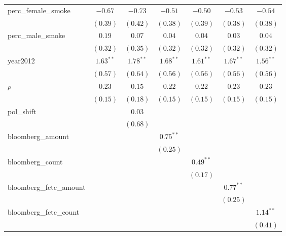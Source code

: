 \begin{table}[!h]
\begin{center}
\begin{tabular}{l c c c c c c }
perc\_female\_smoke     & $-0.67$     & $-0.73$     & $-0.51$     & $-0.50$     & $-0.53$     & $-0.54$     \\
                        & $(0.39)$    & $(0.42)$    & $(0.38)$    & $(0.39)$    & $(0.38)$    & $(0.38)$    \\
perc\_male\_smoke       & $0.19$      & $0.07$      & $0.04$      & $0.04$      & $0.03$      & $0.04$      \\
                        & $(0.32)$    & $(0.35)$    & $(0.32)$    & $(0.32)$    & $(0.32)$    & $(0.32)$    \\
year2012                & $1.63^{**}$ & $1.78^{**}$ & $1.68^{**}$ & $1.61^{**}$ & $1.67^{**}$ & $1.56^{**}$ \\
                        & $(0.57)$    & $(0.64)$    & $(0.56)$    & $(0.56)$    & $(0.56)$    & $(0.56)$    \\
$\rho$                  & $0.23$      & $0.15$      & $0.22$      & $0.22$      & $0.23$      & $0.23$      \\
                        & $(0.15)$    & $(0.18)$    & $(0.15)$    & $(0.15)$    & $(0.15)$    & $(0.15)$    \\
pol\_shift              &             & $0.03$      &             &             &             &             \\
                        &             & $(0.68)$    &             &             &             &             \\
bloomberg\_amount       &             &             & $0.75^{**}$ &             &             &             \\
                        &             &             & $(0.25)$    &             &             &             \\
bloomberg\_count        &             &             &             & $0.49^{**}$ &             &             \\
                        &             &             &             & $(0.17)$    &             &             \\
bloomberg\_fctc\_amount &             &             &             &             & $0.77^{**}$ &             \\
                        &             &             &             &             & $(0.25)$    &             \\
bloomberg\_fctc\_count  &             &             &             &             &             & $1.14^{**}$ \\
                        &             &             &             &             &             & $(0.41)$    \\

\end{tabular}
\end{center}
\end{table}
